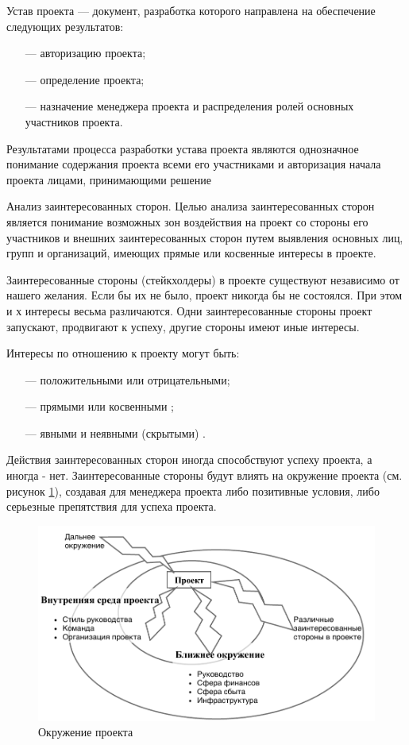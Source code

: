 Устав проекта --- документ, разработка которого направлена на обеспечение следующих результатов:
\begin{itemize}
	\item [---]авторизацию проекта;
\item [---]определение проекта;
\item [---]назначение менеджера проекта и распределения ролей основных участников проекта.
\end{itemize}

Результатами процесса разработки устава проекта являются однознач­ное понимание содержания проекта всеми его участниками и автори­зация начала проекта лицами, принимающими решение \cite[135--137]{polkovnikov}

Анализ заинтересованных сторон.
Целью анализа заинтересованных сторон является понимание возмож­ных зон воздействия на проект со стороны его участников и внешних заинтересованных сторон путем выявления основных лиц, групп и организаций, имеющих прямые или косвенные интересы в проекте.

Заинтересованные стороны (стейкхолдеры) в проекте существуют независимо от нашего желания.
Если бы их не было, проект никогда бы не состоялся.
При этом и х интересы весьма различаются.
Одни заинтересованные стороны проект запускают, продвигают к успеху, другие стороны имеют иные интересы.

Интересы по отношению к проекту могут быть:
\begin{itemize}
	\item [---]положительными или отрицательными;
	\item [---]прямыми или косвенными ;
	\item [---]явными и неявными (скрытыми) .
\end{itemize}

Действия заинтересованных сторон иногда способствуют успеху проекта, а иногда - нет.
Заинтересованные стороны будут влиять на окружение проекта (см. рисунок \ref{fig:okuzhenie}), создавая для менеджера проекта либо позитивные условия, либо серьезные препятствия для успеха проекта.

\begin{figure}[h]
	\centering
	\includegraphics[width=\linewidth]{okruzh}
	\caption{Окружение проекта}
	\label{fig:okuzhenie}
\end{figure}

